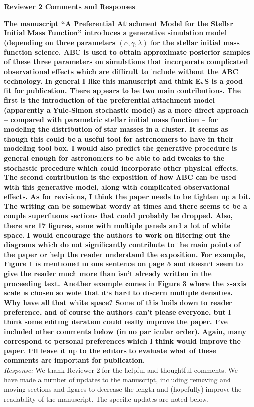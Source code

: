 \documentclass[11pt, oneside]{article}   	%
\begin{document}
\noindent \underline{\bf Reviewer 2 Comments and Responses}

{\bf The manuscript ``A Preferential Attachment Model for the Stellar Initial Mass Function'' introduces a generative simulation model (depending on three parameters $(\alpha, \gamma, \lambda)$ for the stellar initial mass function science. ABC is used to obtain approximate posterior samples of these three parameters on simulations that incorporate complicated observational effects which are difficult to include without the ABC technology.
In general I like this manuscript and think EJS is a good fit for publication. There appears to be two main contributions. The first is the introduction of the preferential attachment model (apparently a Yule-Simon stochastic model) as a more direct approach -- compared with parametric stellar initial mass function -- for modeling the distribution of star masses in a cluster. It seems as though this could be a useful tool for astronomers to have in their modeling tool box. I would also predict the generative procedure is general enough for astronomers to be able to add tweaks to the stochastic procedure which could incorporate other physical effects. The second contribution is the exposition of how ABC can be used with this generative model, along with complicated observational effects.
As for revisions, I think the paper needs to be tighten up a bit. The writing can be somewhat wordy at times and there seems to be a couple superfluous sections that could probably be dropped. Also, there are 17 figures, some with multiple panels and a lot of white space. I would encourage the authors to work on filtering out the diagrams which do not significantly contribute to the main points of the paper or help the reader understand the exposition. For example, Figure 1 is mentioned in one sentence on page 5 and doesn't seem to give the reader much more than isn't already written in the proceeding text. Another example comes in Figure 3 where the x-axis scale is chosen so wide that it's hard to discern multiple densities. Why have all that white space? Some of this boils down to reader preference, and of course the authors can't please everyone, but I think some editing iteration could really improve the paper. I've included other comments below (in no particular order). Again, many correspond to personal preferences which I think would improve the paper. I'll leave it up to the editors to evaluate what of these comments are important for publication.
} \\
\noindent \emph{Response:} We thank Reviewer 2 for the helpful and thoughtful comments.  We have made a number of updates to the manuscript, including removing and moving sections and figures to decrease the length and (hopefully) improve the readability of the manuscript.  The specific updates are noted below.
\bigskip
\end{document}
